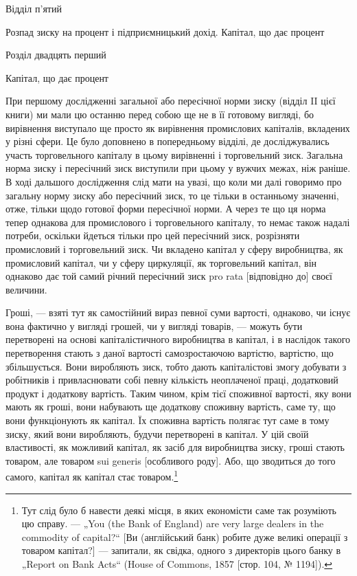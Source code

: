 Відділ п’ятий

Розпад зиску на процент і підприємницький
дохід. Капітал, що дає процент

Розділ двадцять перший

Капітал, що дає процент

При першому дослідженні загальної або пересічної норми
зиску (відділ II цієї книги) ми мали цю останню перед собою
ще не в її готовому вигляді, бо вирівнення виступало ще просто
як вирівнення промислових капіталів, вкладених у різні сфери.
Це було доповнено в попередньому відділі, де досліджувались
участь торговельного капіталу в цьому вирівненні і торговельний
зиск. Загальна норма зиску і пересічний зиск виступили
при цьому у вужчих межах, ніж раніше. В ході дальшого
дослідження слід мати на увазі, що коли ми далі говоримо
про загальну норму зиску або пересічний зиск, то це тільки
в останньому значенні, отже, тільки щодо готової форми пересічної
норми. А через те що ця норма тепер однакова для промислового
і торговельного капіталу, то немає також надалі
потреби, оскільки йдеться тільки про цей пересічний зиск,
розрізняти промисловий і торговельний зиск. Чи вкладено капітал
у сферу виробництва, як промисловий капітал, чи у сферу циркуляції,
як торговельний капітал, він однаково дає той самий
річний пересічний зиск pro rata [відповідно до] своєї величини.

Гроші, — взяті тут як самостійний вираз певної суми вартості,
однаково, чи існує вона фактично у вигляді грошей, чи у
вигляді товарів, — можуть бути перетворені на основі капіталістичного
виробництва в капітал, і в наслідок такого перетворення
стають з даної вартості самозростаючою вартістю, вартістю,
що збільшується. Вони виробляють зиск, тобто дають
капіталістові змогу добувати з робітників і привласнювати собі
певну кількість неоплаченої праці, додатковий продукт і додаткову
вартість. Таким чином, крім тієї споживної вартості, яку
вони мають як гроші, вони набувають ще додаткову споживну
вартість, саме ту, що вони функціонують як капітал. Їх споживна
вартість полягає тут саме в тому зиску, який вони виробляють,
будучи перетворені в капітал. У цій своїй властивості,
як можливий капітал, як засіб для виробництва зиску, гроші
стають товаром, але товаром sui generis [особливого роду].
Або, що зводиться до того самого, капітал як капітал стає
товаром.\footnote{
Тут слід було б навести деякі місця, в яких економісти саме так розуміють
цю справу. — „You (the Bank of England) are very large dealers in the
commodity of capital?“ [Ви (англійський банк) робите дуже великі операції
з товаром капітал?] — запитали, як свідка, одного з директорів цього банку
в „Report on Bank Acts“ (House of Commons, 1857 [стор. 104, № 1194]).
}

